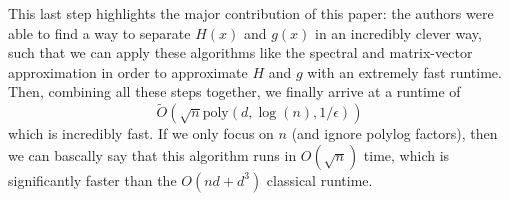 \documentclass[11pt]{article}
\begin{document}
This last step highlights the major contribution of this paper: the authors were able to find a way to separate 
\( H(x) \) and \( g(x) \) in an incredibly clever way, such that we can apply these algorithms like the 
spectral and matrix-vector approximation in order to approximate \( H \) and \( g \) with an extremely fast 
runtime. Then, combining all these steps together, we finally arrive at a runtime of 
\[
	\widetilde O(\sqrt{n} \mathrm{poly}(d, \log(n), 1 / \epsilon))  
\] 
which is incredibly fast. If we only focus on \( n \) (and ignore polylog factors), 
then we can bascally say that this algorithm 
runs in \( O(\sqrt{n}) \) time, which is significantly faster than the \( O(nd + d^3) \) classical runtime.

 
   
  
%
\end{document}
